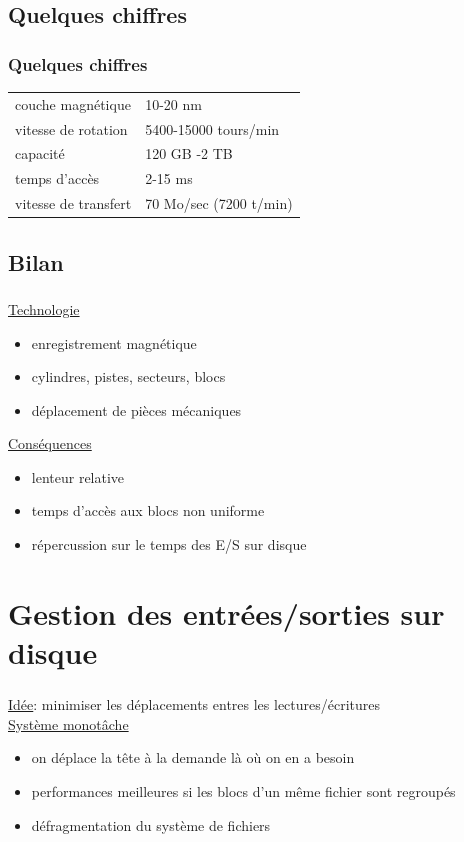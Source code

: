 \subsection{Quelques chiffres}
\begin{frame}
  \frametitle{Quelques chiffres}
  \large
  \begin{tabular}{ll}
    couche magnétique & 10-20 nm \vspace{0.2cm}\\
    vitesse de rotation & 5400-15000 tours/min \vspace{0.2cm}\\
    capacité & 120 GB -2 TB \vspace{0.2cm}\\
    temps d'accès & 2-15 ms \vspace{0.2cm}\\
    vitesse de transfert & 70 Mo/sec (7200 t/min) 
  \end{tabular}
  \normalsize
\end{frame}

\subsection{Bilan}
\begin{frame}
\frametitle{\insertsubsection}
\underline{Technologie}
\begin{itemize}
\item enregistrement magnétique
\item cylindres, pistes, secteurs, blocs
\item déplacement de pièces mécaniques
\end{itemize}
\vspace{0.5cm}
\underline{Conséquences}
\begin{itemize}
\item \alert{lenteur relative}
\item \alert{temps d'accès aux blocs non uniforme}
\item[\ding{212}] répercussion sur le temps des E/S sur disque
\end{itemize}
\end{frame}


\section{Gestion des entrées/sorties sur disque}

\begin{frame}    
  \frametitle{\insertsection}
  \underline{Idée}: minimiser les déplacements entres les lectures/écritures\\
  \vspace{0.5cm}
  \underline{Système monotâche}
  \begin{itemize}
  \item on déplace la tête à la demande là où on en a besoin
  \item performances meilleures si les blocs d'un même fichier sont regroupés
  \item[\ding{212}] \alert{défragmentation} du système de fichiers    
  \end{itemize}
\end{frame}

